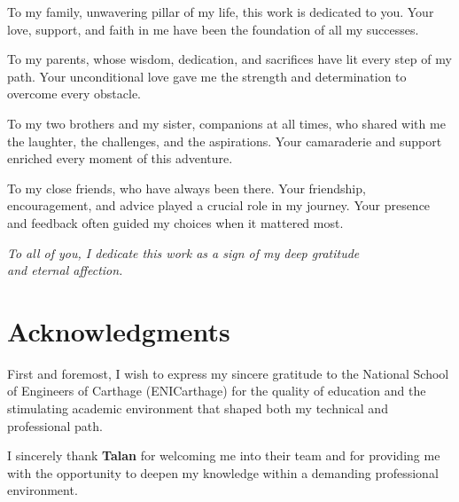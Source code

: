 \documentclass[12pt,a4paper]{report}
\begin{document}
\vspace{1.2cm}

To my family, unwavering pillar of my life, this work is dedicated to you.
Your love, support, and faith in me have been the foundation of all my successes.

\vspace{1cm}

To my parents, whose wisdom, dedication, and sacrifices have lit every step of my path.
Your unconditional love gave me the strength and determination to overcome every obstacle.

\vspace{1cm}

To my two brothers and my sister, companions at all times, who shared with me
the laughter, the challenges, and the aspirations. Your camaraderie and support
enriched every moment of this adventure.

\vspace{1cm}

To my close friends, who have always been there. Your friendship, encouragement,
and advice played a crucial role in my journey. Your presence and feedback
often guided my choices when it mattered most.

\vspace{1.4cm}

\begin{flushright}
\itshape
To all of you, I dedicate this work as a sign of my deep gratitude\\
and eternal affection.
\end{flushright}

\newpage
\thispagestyle{fancy}
\section*{Acknowledgments}

\vspace{1cm}

First and foremost, I wish to express my sincere gratitude to the National School
of Engineers of Carthage (ENICarthage) for the quality of education and the
stimulating academic environment that shaped both my technical and professional path.

\vspace{0.9cm}

I sincerely thank \textbf{Talan} for welcoming me into their team and for providing
me with the opportunity to deepen my knowledge within a demanding professional
environment.
\end{document}
